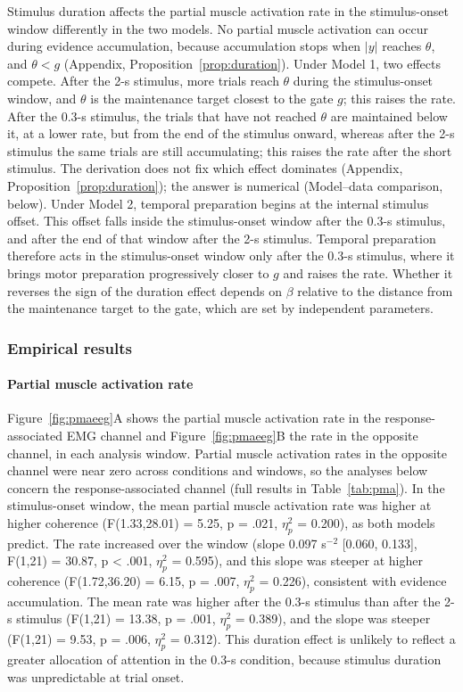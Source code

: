 \documentclass[a4paper,11pt]{article}
\theoremstyle{definition}
\newcommand{\1}{\mathbbm{1}}
\begin{document}
Stimulus duration affects the partial muscle activation rate in the stimulus-onset window differently in the two models. No partial muscle activation can occur during evidence accumulation, because accumulation stops when $|y|$ reaches $\theta$, and $\theta<g$ (Appendix, Proposition~\ref{prop:duration}). Under Model 1, two effects compete. After the 2-s stimulus, more trials reach $\theta$ during the stimulus-onset window, and $\theta$ is the maintenance target closest to the gate $g$; this raises the rate. After the 0.3-s stimulus, the trials that have not reached $\theta$ are maintained below it, at a lower rate, but from the end of the stimulus onward, whereas after the 2-s stimulus the same trials are still accumulating; this raises the rate after the short stimulus. The derivation does not fix which effect dominates (Appendix, Proposition~\ref{prop:duration}); the answer is numerical (Model--data comparison, below). Under Model 2, temporal preparation begins at the internal stimulus offset. This offset falls inside the stimulus-onset window after the 0.3-s stimulus, and after the end of that window after the 2-s stimulus. Temporal preparation therefore acts in the stimulus-onset window only after the 0.3-s stimulus, where it brings motor preparation progressively closer to $g$ and raises the rate. Whether it reverses the sign of the duration effect depends on $\beta$ relative to the distance from the maintenance target to the gate, which are set by independent parameters.


\subsubsection{Empirical results}

\paragraph{Partial muscle activation rate}

Figure~\ref{fig:pmaeeg}A shows the partial muscle activation rate in the response-associated EMG channel and Figure~\ref{fig:pmaeeg}B the rate in the opposite channel, in each analysis window. Partial muscle activation rates in the opposite channel were near zero across conditions and windows, so the analyses below concern the response-associated channel (full results in Table~\ref{tab:pma}). In the stimulus-onset window, the mean partial muscle activation rate was higher at higher coherence (F(1.33,28.01) = 5.25, p = .021, $\eta_{p}^{2}$ = 0.200), as both models predict. The rate increased over the window (slope 0.097 s$^{-2}$ [0.060, 0.133], F(1,21) = 30.87, p < .001, $\eta_{p}^{2}$ = 0.595), and this slope was steeper at higher coherence (F(1.72,36.20) = 6.15, p = .007, $\eta_{p}^{2}$ = 0.226), consistent with evidence accumulation. The mean rate was higher after the 0.3-s stimulus than after the 2-s stimulus (F(1,21) = 13.38, p = .001, $\eta_{p}^{2}$ = 0.389), and the slope was steeper (F(1,21) = 9.53, p = .006, $\eta_{p}^{2}$ = 0.312). This duration effect is unlikely to reflect a greater allocation of attention in the 0.3-s condition, because stimulus duration was unpredictable at trial onset.
\end{document}
